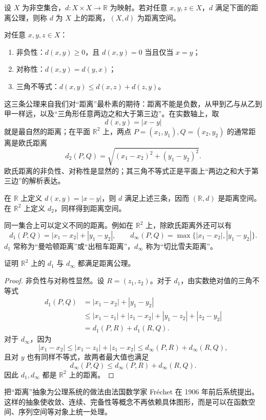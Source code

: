 \begin{definition}[距离空间]\label{def:距离空间}
  设 \(X\) 为非空集合，\(d:X\times X\to\mathbb R\) 为映射。若对任意 \(x,y,z\in X\)，\(d\) 满足下面的距离公理，则称 \(d\) 为 \(X\) 上的距离，\((X,d)\) 为距离空间。
\end{definition}
\begin{axiom}[距离公理]
  对任意 \(x,y,z\in X\)：
  \begin{enumerate}
    \item 非负性：\(d(x,y)\ge 0\)，且 \(d(x,y)=0\) 当且仅当 \(x=y\)；
    \item 对称性：\(d(x,y)=d(y,x)\)；
    \item 三角不等式：\(d(x,y)\le d(x,z)+d(z,y)\)。
  \end{enumerate}
\end{axiom}
这三条公理来自我们对“距离”最朴素的期待：距离不能是负数，从甲到乙与从乙到甲一样远，以及“三角形任意两边之和大于第三边”。在实数轴上，取
\[
d(x,y)=|x-y|
\]
就是最自然的距离；在平面 \(\mathbb R^2\) 上，两点 \(P=(x_1,y_1),Q=(x_2,y_2)\) 的通常距离是欧氏距离
\[
d_2(P,Q)=\sqrt{(x_1-x_2)^2+(y_1-y_2)^2}.
\]
欧氏距离的非负性、对称性是显然的；其三角不等式正是平面上“两边之和大于第三边”的解析表达。
\begin{corollary}
  在 \(\mathbb R\) 上定义 \(d(x,y)=|x-y|\)，则 \(d\) 满足上述三条，因而 \((\mathbb R,d)\) 是距离空间。在 \(\mathbb R^2\) 上定义 \(d_2\)，同样得到距离空间。
\end{corollary}
同一集合上可以定义不同的距离。例如在 \(\mathbb R^2\) 上，除欧氏距离外还可以有
\[
d_1(P,Q)=|x_1-x_2|+|y_1-y_2|,
\qquad
d_\infty(P,Q)=\max\{|x_1-x_2|,|y_1-y_2|\}.
\]
\(d_1\) 常称为“曼哈顿距离”或“出租车距离”，\(d_\infty\) 称为“切比雪夫距离”。
\begin{example}
  证明 \(\mathbb R^2\) 上的 \(d_1\) 与 \(d_\infty\) 都满足距离公理。
\end{example}
\begin{proof}
  非负性与对称性显然。设 \(R=(z_1,z_2)\)。对于 \(d_1\)，由实数绝对值的三角不等式
  \[
  \begin{aligned}
  d_1(P,Q)&=|x_1-x_2|+|y_1-y_2|\\
  &\le |x_1-z_1|+|z_1-x_2|+|y_1-z_2|+|z_2-y_2|\\
  &=d_1(P,R)+d_1(R,Q).
  \end{aligned}
  \]
  对于 \(d_\infty\)，因为
  \[
  |x_1-x_2|\le |x_1-z_1|+|z_1-x_2|\le d_\infty(P,R)+d_\infty(R,Q),
  \]
  且对 \(y\) 也有同样不等式，故两者最大值也满足
  \[
  d_\infty(P,Q)\le d_\infty(P,R)+d_\infty(R,Q).
  \]
  因此 \(d_1,d_\infty\) 都是 \(\mathbb R^2\) 上的距离。
\end{proof}
\begin{zhu}
  把“距离”抽象为公理系统的做法由法国数学家 Fréchet 在 1906 年前后系统提出。这样的抽象使收敛、连续、完备性等概念不再依赖具体图形，而是可以在函数空间、序列空间等对象上统一处理。
\end{zhu}


